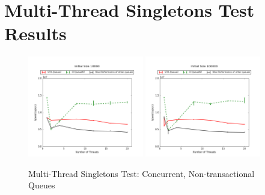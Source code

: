 \section{Multi-Thread Singletons Test Results}
\label{app:queue_mt}

\begin{figure}[H]
\centering
    \includegraphics[width=0.45\textwidth]{concurrent/Q:RandSingleOps10000.png}
    \includegraphics[width=0.45\textwidth]{concurrent/Q:RandSingleOps100000.png}
\caption{Multi-Thread Singletons Test: Concurrent, Non-transactional Queues}
\label{fig:concurrent_qs}
\end{figure}

